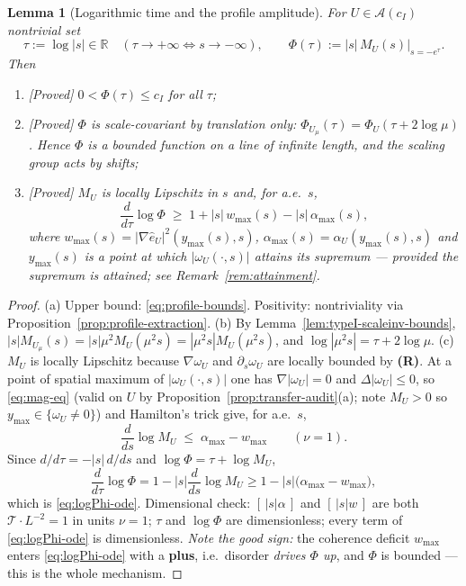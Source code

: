 \documentclass[11pt]{article}
\newtheorem{lemma}[theorem]{Lemma}
\theoremstyle{definition}
\theoremstyle{remark}
\newcommand{\R}{\mathbb{R}}
\begin{document}
\begin{lemma}[Logarithmic time and the profile amplitude]\label{lem:logtime}
  For $U\in\mathcal{A}(c_I)$ nontrivial set
  \[
    \tau := \log|s| \in\R \quad (\tau\to+\infty \iff s\to-\infty),
    \qquad
    \Phi(\tau) := |s|\,M_U(s)\big|_{s=-e^\tau} .
  \]
  Then
  \begin{enumerate}[label=(\alph*)]
  \item \emph{[Proved]} $0<\Phi(\tau)\leq c_I$ for all $\tau$;
  \item \emph{[Proved]} $\Phi$ is scale-covariant by translation only:
    $\Phi_{U_\mu}(\tau)=\Phi_U(\tau+2\log\mu)$. Hence $\Phi$ is a
    \emph{bounded} function on a \emph{line of infinite length}, and the
    scaling group acts by shifts;
  \item \emph{[Proved]} $M_U$ is locally Lipschitz in $s$ and, for a.e.\ $s$,
    \begin{equation}\label{eq:logPhi-ode}
      \frac{d}{d\tau}\log\Phi \;\geq\; 1 + |s|\,w_{\max}(s) - |s|\,\alpha_{\max}(s),
    \end{equation}
    where $w_{\max}(s)=|\nabla\hat e_U|^2(y_{\max}(s),s)$,
    $\alpha_{\max}(s)=\alpha_U(y_{\max}(s),s)$ and $y_{\max}(s)$ is a point
    at which $|\omega_U(\cdot,s)|$ attains its supremum --- \emph{provided
    the supremum is attained}; see Remark~\ref{rem:attainment}.
  \end{enumerate}
\end{lemma}
\begin{proof}
  (a) Upper bound: \eqref{eq:profile-bounds}. Positivity: nontriviality via
  Proposition~\ref{prop:profile-extraction}. (b) By
  Lemma~\ref{lem:typeI-scaleinv-bounds},
  $|s|M_{U_\mu}(s)=|s|\mu^2M_U(\mu^2s)=|\mu^2s|M_U(\mu^2s)$, and
  $\log|\mu^2s|=\tau+2\log\mu$.
  (c) $M_U$ is locally Lipschitz because $\nabla\omega_U$ and
  $\partial_s\omega_U$ are locally bounded by \textbf{(R)}. At a point of
  spatial maximum of $|\omega_U(\cdot,s)|$ one has $\nabla|\omega_U|=0$ and
  $\Delta|\omega_U|\leq0$, so \eqref{eq:mag-eq} (valid on $U$ by
  Proposition~\ref{prop:transfer-audit}(a); note $M_U>0$ so
  $y_{\max}\in\{\omega_U\neq0\}$) and Hamilton's trick give, for a.e.\ $s$,
  \[
    \frac{d}{ds}\log M_U \;\leq\; \alpha_{\max} - w_{\max}
    \qquad(\nu=1).
  \]
  Since $d/d\tau=-|s|\,d/ds$ and $\log\Phi=\tau+\log M_U$,
  \[
    \frac{d}{d\tau}\log\Phi
    = 1 - |s|\frac{d}{ds}\log M_U
    \geq 1 - |s|\bigl(\alpha_{\max}-w_{\max}\bigr),
  \]
  which is \eqref{eq:logPhi-ode}. Dimensional check: $[\,|s|\alpha\,]$ and
  $[\,|s|w\,]$ are both $\mathcal{T}\cdot L^{-2}=1$ in units $\nu=1$; $\tau$
  and $\log\Phi$ are dimensionless; every term of
  \eqref{eq:logPhi-ode} is dimensionless. \emph{Note the good sign:} the
  coherence deficit $w_{\max}$ enters \eqref{eq:logPhi-ode} with a
  \textbf{plus}, i.e.\ disorder \emph{drives $\Phi$ up}, and $\Phi$ is
  bounded --- this is the whole mechanism.
\end{proof}
\end{document}
